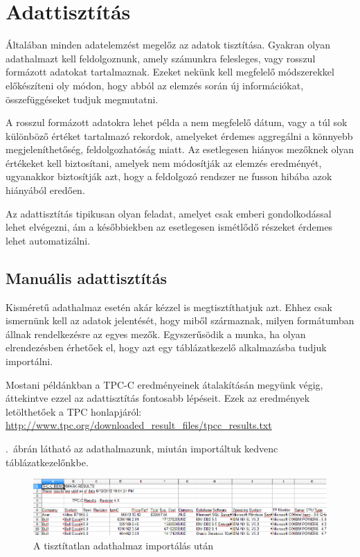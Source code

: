 \documentclass[a4paper,10pt,titlepage]{article}
\begin{document}
\section{Adattisztítás}

Általában minden adatelemzést megelőz az adatok tisztítása. Gyakran olyan adathalmazt kell feldolgoznunk, amely számunkra felesleges, vagy rosszul formázott adatokat tartalmaznak. Ezeket nekünk kell megfelelő módszerekkel előkészíteni oly módon, hogy abból az elemzés során új információkat, összefüggéseket tudjuk megmutatni.

A rosszul formázott adatokra lehet példa a nem megfelelő dátum, vagy a túl sok különböző értéket tartalmazó rekordok, amelyeket érdemes aggregálni a könnyebb megjeleníthetőség, feldolgozhatóság miatt. Az esetlegesen hiányos mezőknek olyan értékeket kell biztosítani, amelyek nem módosítják az elemzés eredményét, ugyanakkor biztosítják azt, hogy a feldolgozó rendszer ne fusson hibába azok hiányából eredően.

Az adattisztítás tipikusan olyan feladat, amelyet csak emberi gondolkodással lehet elvégezni, ám a későbbiekben az esetlegesen ismétlődő részeket érdemes lehet automatizálni.

\subsection{Manuális adattisztítás}

Kisméretű adathalmaz esetén akár kézzel is megtisztíthatjuk azt. Ehhez csak ismernünk kell az adatok jelentését, hogy miből származnak, milyen formátumban állnak rendelkezésre az egyes mezők. Egyszerűsödik a munka, ha olyan elrendezésben érhetőek el, hogy azt egy táblázatkezelő alkalmazásba tudjuk importálni. 

Mostani példánkban a TPC-C eredményeinek átalakításán megyünk végig, áttekintve ezzel az adattisztítás fontosabb lépéseit. Ezek az eredmények letölthetőek a TPC honlapjáról: \url{http://www.tpc.org/downloaded\_result\_files/tpcc\_results.txt}

.~ábrán látható az adathalmazunk, miután importáltuk kedvenc táblázatkezelőnkbe.

\begin{figure}[h!]
\centering
\includegraphics[width=1.00\textwidth]{figures/tpc_raw.png}
\caption{A tisztítatlan adathalmaz importálás után \label{fig:tpc_raw}}
\end{figure}
\end{document}
